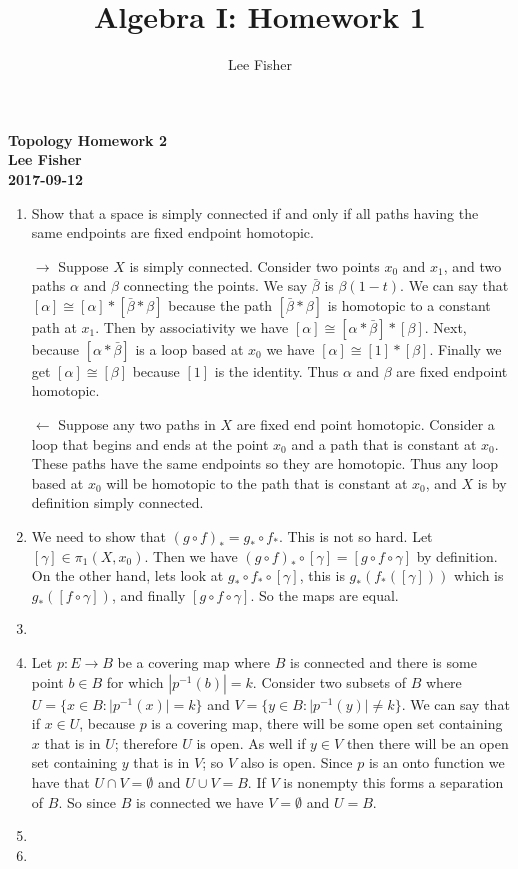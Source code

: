 \documentclass[12pt]{report}
\title{\textbf{Algebra I: Homework 1}}
\author{Lee Fisher}
\date{}
\providecommand{\abs}[1]{\lvert#1\rvert} \providecommand{\norm}[1]{\lVert#1\rVert}
\begin{document}
\textbf{Topology Homework 2}\\
\indent \textbf{Lee Fisher}\\
\indent \textbf{2017-09-12}

\begin{enumerate}
\item Show that a space is simply connected if and only if all paths having the
same endpoints are fixed endpoint homotopic.

$\rightarrow$ Suppose $X$ is simply connected. Consider two points $x_0$ and 
$x_1$, and two paths $\alpha$ and $\beta$ connecting the points. We say 
$\bar{\beta}$ is $\beta(1-t)$. We can say that $[\alpha] \cong [\alpha] * 
[\bar{\beta} * \beta]$ because the path $[\bar{\beta} * \beta]$ is homotopic to
a constant path at $x_1$. Then by associativity we have $[\alpha] \cong [\alpha 
* \bar{\beta}] * [\beta]$. Next, because $[\alpha *\bar{\beta}]$ is a loop 
based at $x_0$ we have $[\alpha] \cong [1] * [\beta]$. Finally we get $[\alpha]
\cong [\beta]$ because $[1]$ is the identity. Thus $\alpha$ and $\beta$ are 
fixed endpoint homotopic.


$\leftarrow$ Suppose any two paths in $X$ are fixed end point homotopic. 
Consider a loop that begins and ends at the point $x_0$ and a path that is 
constant at $x_0$. These paths have the same endpoints so they are homotopic.
Thus any loop based at $x_0$ will be homotopic to the path that is constant at 
$x_0$, and $X$ is by definition simply connected. 

\item We need to show that $(g \circ f)_* = g_* \circ f_*$. This is not so 
hard. Let $[\gamma] \in \pi_1(X,x_0)$. Then we have $(g \circ f)_* \circ 
[\gamma] = [g \circ f \circ \gamma]$ by definition. On the other hand, lets 
look at $g_* \circ f_* \circ [\gamma]$, this is $g_* ( f_*([\gamma]))$ which is
$g_*([f \circ \gamma])$, and finally $[g \circ f \circ \gamma]$. So the maps are 
equal.


\item 


\item Let $p: E \to B$ be a covering map where $B$ is connected and there is 
some point $b \in B$ for which $|p^{-1}(b)| = k$. Consider two subsets of $B$
where $U = \{x \in B : \abs{p^{-1}(x)} = k \}$ and $V = \{y \in B : \abs{p^{-1}(y)} 
\neq k \}$. We can say that if $x \in U$, because $p$ is a covering map, there 
will be some open set containing $x$ that is in $U$; therefore $U$ is open. As 
well if $y \in V$ then there will be an open set containing $y$ that is in $V$;
so $V$ also is open. Since $p$ is an onto function we have that $U \cap V = 
\emptyset$ and $U \cup V = B$. If $V$ is nonempty this forms a separation of 
$B$. So since $B$ is connected we have $V = \emptyset$ and $U = B$.  

\item 
\item 
\end{enumerate}
\end{document}
